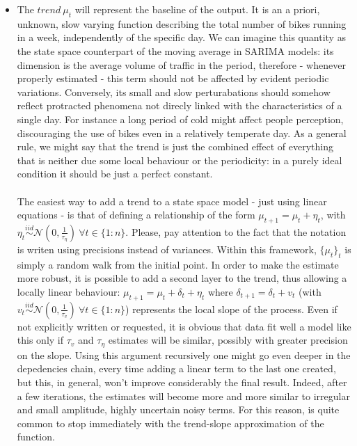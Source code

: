 \documentclass[11pt,twoside]{report}
\begin{document}
\begin{itemize}
	\item The $ trend\ \mu_t$ will represent the baseline of the output. It is an a priori, unknown, slow varying function describing the total number of bikes running in a week, independently of the specific day. We can imagine this quantity as the state space counterpart of the moving average in SARIMA models: its dimension is the average volume of traffic in the period, therefore - whenever properly estimated - this term should not be affected by evident periodic variations. Conversely, its small and slow perturabations should somehow reflect protracted phenomena not direcly linked with the characteristics of a single day. For instance a long period of cold might affect people perception, discouraging the use of bikes even in a relatively temperate day. As a general rule, we might say that the trend is just the combined effect of everything that is neither due some local behaviour or the periodicity: in a purely ideal condition it should be just a perfect constant.\\
	\\ 
	The easiest way to add a trend to a state space model - just using linear equations - is that of defining a relationship of the form $ \mu_{t+1} = \mu_t +\eta_t $, with $ \eta_t\overset{iid}{\sim}\mathcal{N}(0,\frac{1}{\tau_\eta})\ \forall t\in\{1:n\}$. Please, pay attention to the fact that the notation is writen using precisions instead of variances. Within this framework, $ \{\mu_t\}_t $ is simply a random walk from the initial point. In order to make the estimate more robust, it is possible to add a second layer to the trend, thus allowing a locally linear behaviour: $\mu_{t+1} = \mu_t+\delta_t +\eta_t $ where $\delta_{t+1} = \delta_t +v_t $ (with $ v_t\overset{iid}{\sim}\mathcal{N}(0,\frac{1}{\tau_v})\ \forall t\in\{1:n\}$) represents the local slope of the process. Even if not explicitly written or requested, it is obvious that data fit well a model like this only if $ \tau_v $ and $ \tau_\eta $ estimates will be similar, possibly with greater precision on the slope. Using this argument recursively one might go even deeper in the depedencies chain, every time adding a linear term to the last one created, but this, in general, won't improve considerably the final result. Indeed, after a few iterations, the estimates will become more and more similar to irregular and small amplitude, highly uncertain noisy terms. For this reason, is quite common to stop immediately with the trend-slope approximation of the function.

\end{itemize}
\end{document}
